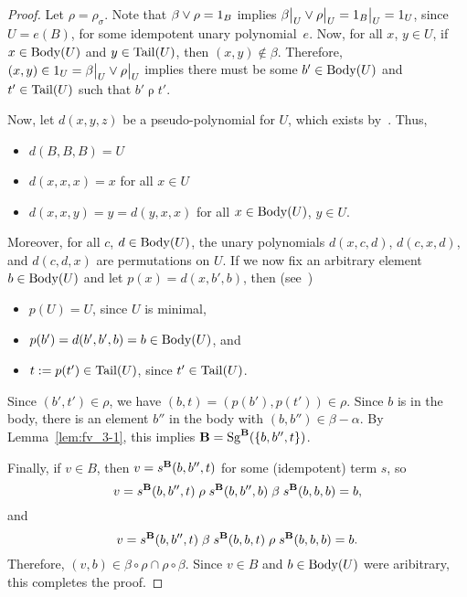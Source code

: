 \newcommand\rhosig{\ensuremath{\rho}}
\begin{proof}
\noindent Let $\rho = \rho_\sigma$. Note that
$\beta \join \rhosig = 1_B$ implies
$\restr{\beta}{U} \join \restr{\rhosig}{U} = \restr{1_B}{U} = 1_U$,
since $U = e(B)$, for some idempotent unary polynomial~$e$.
Now, for all $x$, $y \in U$, if $x\in \operatorname{Body}(U)$ and $y\in \operatorname{Tail}(U)$, then
$(x,y) \notin \beta$.  Therefore,
$(x, y) \in  1_U = \restr{\beta}{U} \join \restr{\rhosig}{U}$ implies
there must be some $b' \in \operatorname{Body}(U)$ and $t'\in \operatorname{Tail}(U)$ such that
$b' \mathrel{\rhosig} t'$.

Now, let $d(x,y,z)$ be a pseudo-\malcev polynomial for $U$,
which exists by~\cite[Lemma~4.20]{HM:1988}.
Thus,
\begin{itemize}
\item $d(B,B,B) = U$
\item $d(x,x,x) = x$ for all $x\in U$
\item $d(x,x,y) = y = d(y,x,x)$ for all $x\in \operatorname{Body}(U)$, $y \in U$.
\end{itemize}
Moreover, for all $c$, $d \in \operatorname{Body}(U)$, the unary polynomials
$d(x,c,d)$, $d(c,x,d)$, and $d(c,d,x)$ are permutations on $U$.
If we now fix an arbitrary element $b\in \operatorname{Body}(U)$ and
let $p(x) = d(x,b',b)$, then (see~\cite[Lemma~4.20]{HM:1988})
\begin{itemize}
\item  $p(U) = U$, since $U$ is minimal,
\item $p(b') = d(b',b',b) = b \in \operatorname{Body}(U)$, and
\item  $t:=p(t')\in \operatorname{Tail}(U)$, since $t'\in \operatorname{Tail}(U)$.
\end{itemize}
Since $(b',t') \in \rhosig$, we have $(b, t) = (p(b'), p(t')) \in \rhosig$.
Since $b$ is in the body, there is an element $b''$ in the body with
$(b,b'') \in \beta - \alpha$. By Lemma~\ref{lem:fv_3-1}, this implies
$\mathbf{B} = \operatorname{Sg}^{\mathbf{B}}(\{b, b'', t\})$.

Finally, if $v \in B$, then $v = s^{\mathbf{B}}(b,b'',t)$ for
some (idempotent) term $s$, so
\[
v = s^{\alg{B}}(b,b'',t)
\mathrel{\rhosig} s^{\alg{B}}(b,b'',b)
\mathrel{\beta} s^{\alg{B}}(b,b,b) = b,
\]
and
\[
v = s^{\alg{B}}(b,b'',t)
\mathrel{\beta}  s^{\alg{B}}(b,b,t)
\mathrel{\rhosig}s^{\alg{B}}(b,b, b)  = b.
\]
Therefore,
$(v,b) \in  \beta \circ \rhosig \cap \rhosig \circ \beta$.
Since $v \in B$ and $b\in \operatorname{Body}(U)$ were aribitrary,
this completes the proof.
\end{proof}



